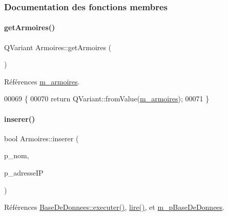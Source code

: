 \subsubsection{Documentation des fonctions membres}
\mbox{\label{class_armoires_a4ad204a0768f9aa9cfb400a362ae7b07}} 
\paragraph{\texorpdfstring{get\+Armoires()}{getArmoires()}}
{\footnotesize\ttfamily Q\+Variant Armoires\+::get\+Armoires (\begin{DoxyParamCaption}{ }\end{DoxyParamCaption})}



Références \hyperlink{class_armoires_a13bc03c96ba9e069bc377f6ea10472ba}{m\+\_\+armoires}.


\begin{DoxyCode}
00069 \{
00070     \textcolor{keywordflow}{return} QVariant::fromValue(\hyperlink{class_armoires_a13bc03c96ba9e069bc377f6ea10472ba}{m\_armoires});
00071 \}
\end{DoxyCode}
\mbox{\label{class_armoires_a0aa944d8f94667783ea95424e1915aba}} 
\paragraph{\texorpdfstring{inserer()}{inserer()}}
{\footnotesize\ttfamily bool Armoires\+::inserer (\begin{DoxyParamCaption}\item[{Q\+String}]{p\+\_\+nom,  }\item[{Q\+String}]{p\+\_\+adresse\+IP }\end{DoxyParamCaption})}



Références \hyperlink{class_base_de_donnees_aa8de5f8f8bb17edc43f5c0ee33712081}{Base\+De\+Donnees\+::executer()}, \hyperlink{class_armoires_a2b64b3df08cf848d06b4ffb6a49ae858}{lire()}, et \hyperlink{class_armoires_a096a57892eaad473fefc2a20fe4965bd}{m\+\_\+p\+Base\+De\+Donnees}.


